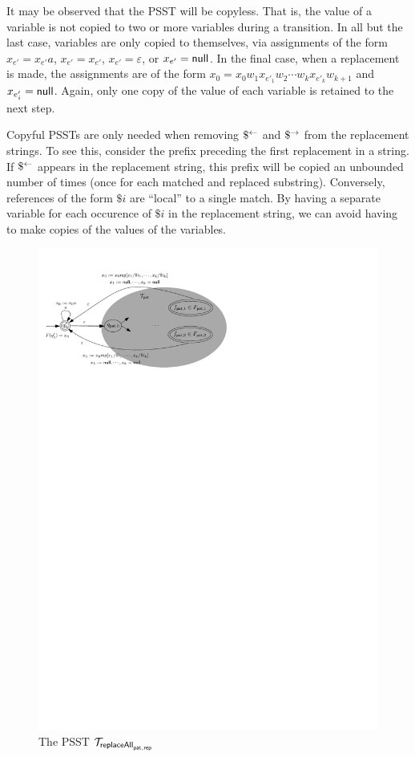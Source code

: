 It may be observed that the PSST will be copyless.
That is, the value of a variable is not copied to two or more variables during a transition.
In all but the last case, variables are only copied to themselves, via assignments of the form $x_{e'} = x_{e'} a$, $x_{e'} = x_{e'}$, $x_{e'} = \varepsilon$, or $x_{e'} = \mathsf{null}$.
In the final case, when a replacement is made, the assignments are of the form
$x_0 = x_0 w_1 x_{e'_1} w_2 \cdots w_k x_{e'_k} w_{k+1}$
and
$x_{e'_i} = \mathsf{null}$.
Again, only one copy of the value of each variable is retained to the next step.

Copyful PSSTs are only needed when removing $\$^{\leftarrow}$ and $\$^{\rightarrow}$ from the replacement strings.
To see this, consider the prefix preceding the first replacement in a string.
If $\$^{\leftarrow}$ appears in the replacement string, this prefix will be copied an unbounded number of times (once for each matched and replaced substring).
Conversely, references of the form $\$i$ are ``local'' to a single match.
By having a separate variable for each occurence of $\$i$ in the replacement string, we can avoid having to make copies of the values of the variables.

\begin{figure}[ht]
    \centering
    \includegraphics[scale=0.9]{psst-replaceall.pdf}
    \caption{The PSST $\mathcal{T}_{\mathsf{replaceAll}_{\mathsf{pat},\mathsf{rep}}}$}
    \label{fig-psst-replaceall}
\end{figure}


